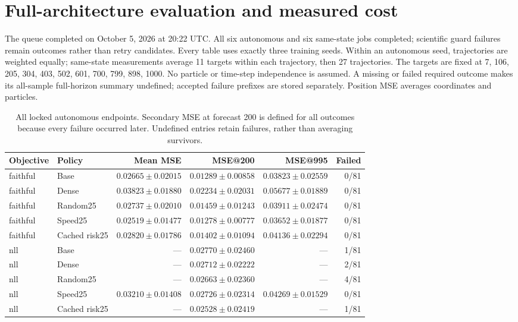 \section{Full-architecture evaluation and measured cost}

\label{sec:full-results}

The queue completed on October 5, 2026 at 20:22 UTC. All six autonomous and six
same-state jobs completed; scientific guard failures remain outcomes rather
than retry candidates. Every table uses exactly three training seeds. Within
an autonomous seed, trajectories are weighted equally; same-state measurements
average 11 targets within each trajectory, then 27 trajectories. The targets
are fixed at 7, 106, 205, 304, 403, 502, 601, 700, 799, 898, 1000. No particle or time-step independence is assumed. A missing or failed required outcome
makes its all-sample full-horizon summary undefined; accepted failure prefixes
are stored separately. Position MSE averages coordinates and particles.


\begin{table}[t]
\centering\small
\caption{All locked autonomous endpoints. Secondary MSE at forecast 200 is defined for all outcomes because every failure occurred later. Undefined entries retain failures, rather than averaging survivors.}
\label{tab:full-endpoints}
\begin{tabular}{llrrrr}
\toprule
Objective & Policy & Mean MSE & MSE@200 & MSE@995 & Failed\\
\midrule
faithful & Base & $0.02665\pm0.02015$ & $0.01289\pm0.00858$ & $0.03823\pm0.02559$ & 0/81\\
faithful & Dense & $0.03823\pm0.01880$ & $0.02234\pm0.02031$ & $0.05677\pm0.01889$ & 0/81\\
faithful & Random25 & $0.02737\pm0.02010$ & $0.01459\pm0.01243$ & $0.03911\pm0.02474$ & 0/81\\
faithful & Speed25 & $0.02519\pm0.01477$ & $0.01278\pm0.00777$ & $0.03652\pm0.01877$ & 0/81\\
faithful & Cached risk25 & $0.02820\pm0.01786$ & $0.01402\pm0.01094$ & $0.04136\pm0.02294$ & 0/81\\
nll & Base & --- & $0.02770\pm0.02460$ & --- & 1/81\\
nll & Dense & --- & $0.02712\pm0.02222$ & --- & 2/81\\
nll & Random25 & --- & $0.02663\pm0.02360$ & --- & 4/81\\
nll & Speed25 & $0.03210\pm0.01408$ & $0.02726\pm0.02314$ & $0.04269\pm0.01529$ & 0/81\\
nll & Cached risk25 & --- & $0.02528\pm0.02419$ & --- & 1/81\\
\bottomrule
\end{tabular}
\end{table}


